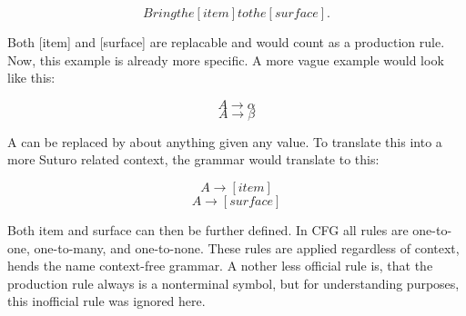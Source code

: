 \documentclass[main.tex]{subfiles}
\begin{document}
\begin{equation}
Bring the [item] to the [surface].
\end{equation}

Both [item] and [surface] are replacable and would count as a production rule. Now, this example is already more specific. A more vague example would look like this:

\begin{equation}
A \rightarrow \alpha
\end{equation}
\begin{equation}
A \rightarrow \beta
\end{equation}

A can be replaced by about anything given any value. To translate this into a more Suturo related context, the grammar would translate to this:

\begin{equation}
A \rightarrow [item] 
\end{equation}
\begin{equation}
A \rightarrow [surface]
\end{equation}

Both item and surface can then be further defined. In CFG all rules are one-to-one, one-to-many, and one-to-none. These rules are applied regardless of context, hends the name context-free grammar. A nother less official rule is, that the production rule always is a nonterminal symbol, but for understanding purposes, this inofficial rule was ignored here.
\end{document}
